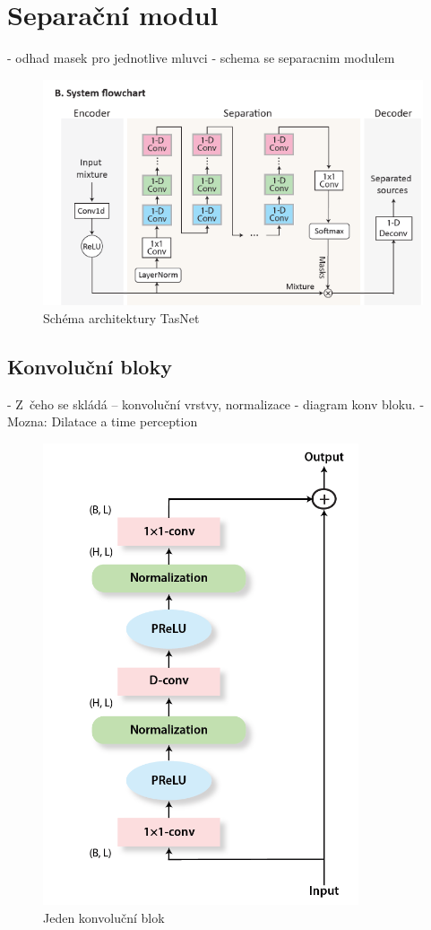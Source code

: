 \section{Separační modul}
- odhad masek pro jednotlive mluvci
- schema se separacnim modulem
\begin{figure}[H]
    \centering
    \includegraphics[scale=0.6]{obrazky-figures/tasnet-architecture.png}
    \caption{\label{fig:tasnet-modul}Schéma architektury TasNet}
\end{figure}


\subsection{Konvoluční bloky}
- Z~čeho se skládá -- konvoluční vrstvy, normalizace
- diagram konv bloku.
- Mozna: Dilatace a time perception
\begin{figure}[H]
    \centering
    \includegraphics[scale=0.5]{obrazky-figures/conv-res-block.png}
    \caption{\label{fig:tasnet-convblock}Jeden konvoluční blok}
\end{figure}


